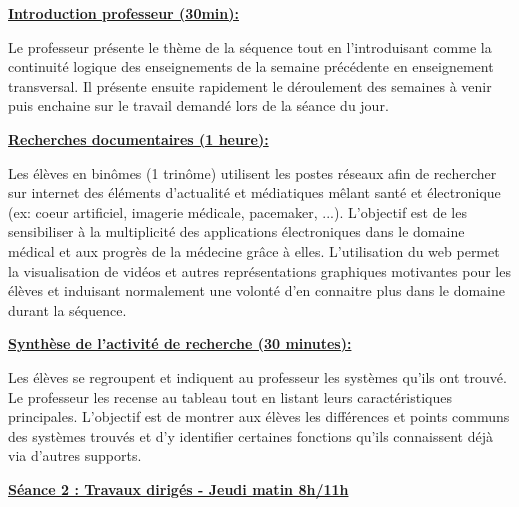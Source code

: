 \documentclass[12pt]{article}
\begin{document}
\begin{adjustwidth}{5em}{0pt}
\color{blue}
\hspace{20pt}\textbf{\underline{Introduction professeur (30min):}}\par
\vspace{10pt}
\color{black}
Le professeur présente le thème de la séquence tout en l'introduisant comme la continuité logique des enseignements de la semaine précédente en enseignement transversal. Il présente ensuite rapidement le déroulement des semaines à venir puis enchaine sur le travail demandé lors de la séance du jour.\par
\vspace{10pt}


\color{blue}
\textbf{\underline{Recherches documentaires (1 heure):}}\par
\vspace{10pt}
\color{black}
Les élèves en binômes (1 trinôme) utilisent les postes réseaux afin de rechercher sur internet des éléments d'actualité et médiatiques mêlant santé et électronique (ex: coeur artificiel, imagerie médicale, pacemaker, ...). L'objectif est de les sensibiliser à la multiplicité des applications électroniques dans le domaine médical et aux progrès de la médecine grâce à elles. L'utilisation du web permet la visualisation de vidéos et autres représentations graphiques motivantes pour les élèves et induisant normalement une volonté d'en connaitre plus dans le domaine durant la séquence.\par
\vspace{10pt}

\color{blue}
\textbf{\underline{Synthèse de l'activité de recherche (30 minutes):}}\par
\vspace{10pt}
\color{black}
Les élèves se regroupent et indiquent au professeur les systèmes qu'ils ont trouvé. Le professeur les recense au tableau tout en listant leurs caractéristiques principales. L'objectif est de montrer aux élèves les différences et points communs des systèmes trouvés et d'y identifier certaines fonctions qu'ils connaissent déjà via d'autres supports. 

\end{adjustwidth}
\vspace{15pt}

\textbf{\underline{Séance 2 : Travaux dirigés - Jeudi matin 8h/11h}}\par
\vspace{10pt}
\end{document}
